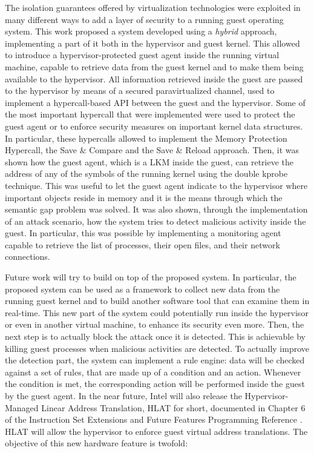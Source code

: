 The isolation guarantees offered by virtualization technologies were exploited in many different ways to add a layer of security to a running guest operating system. This work proposed a system developed using a \emph{hybrid} approach, implementing a part of it both in the hypervisor and guest kernel. This allowed to introduce a hypervisor-protected guest agent inside the running virtual machine, capable to retrieve data from the guest kernel and to make them being available to the hypervisor. All information retrieved inside the guest are passed to the hypervisor by means of a secured paravirtualized channel, used to implement a hypercall-based API between the guest and the hypervisor. Some of the most important hypercall that were implemented were used to protect the guest agent or to enforce security measures on important kernel data structures. In particular, these hypercalls allowed to implement the Memory Protection Hypercall, the Save \& Compare and the Save \& Reload approach. Then, it was shown how the guest agent, which is a LKM inside the guest, can retrieve the address of any of the symbols of the running kernel using the double kprobe technique. This was useful to let the guest agent indicate to the hypervisor where important objects reside in memory and it is the means through which the semantic gap problem was solved. It was also shown, through the implementation of an attack scenario, how the system tries to detect malicious activity inside the guest. In particular, this was possible by implementing a monitoring agent capable to retrieve the list of processes, their open files, and their network connections. 
\par
Future work will try to build on top of the proposed system. In particular, the proposed system can be used as a framework to collect new data from the running guest kernel and to build another software tool that can examine them in real-time. This new part of the system could potentially run inside the hypervisor or even in another virtual machine, to enhance its security even more. Then, the next step is to actually block the attack once it is detected. This is achievable by killing guest processes when malicious activities are detected. To actually improve the detection part, the system can implement a rule engine: data will be checked against a set of rules, that are made up of a condition and an action. Whenever the condition is met, the corresponding action will be performed inside the guest by the guest agent. In the near future, Intel will also release the Hypervisor-Managed Linear Address Translation, HLAT for short, documented in Chapter 6 of the Instruction Set Extensions and Future Features Programming Reference \cite{hlat}. HLAT will allow the hypervisor to enforce guest virtual address translations. The objective of this new hardware feature is twofold: 
